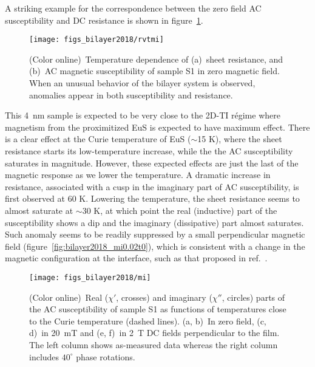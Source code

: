 A striking example for the correspondence between the zero field AC susceptibility and DC resistance is shown in figure~\ref{fig:bilayer2018_mirvt}. %
 \begin{figure}[ht]%
	\centering%
    \subfloat{\label{fig:bilayer2018_s1rvt}}%
    \subfloat{\label{fig:bilayer2018_s1mi}}%
    \texttt{[image: figs\_bilayer2018/rvtmi]}%
    \caption[Coincidental magnetic and resistive anomalies in a (Bi$_{x}$Sb$_{1-x}$)$_2$Te$_3$--EuS bilayer]{\label{fig:bilayer2018_mirvt}(Color online)~Temperature dependence of (a)~sheet resistance, and (b)~AC magnetic susceptibility of sample S1 in zero magnetic field. When an unusual behavior of the bilayer system is observed, anomalies appear in both susceptibility and resistance.}%
\end{figure}%
This 4~nm sample is expected to be very close to the 2D-TI r\'egime where magnetism from the proximitized EuS is expected to have maximum effect. There is a clear effect at the Curie temperature of EuS ($\sim$15 K), where the sheet resistance starts its low-temperature increase, while the the AC susceptibility saturates in magnitude. However, these expected effects are just the last of the magnetic response as we lower the temperature. A dramatic increase in resistance, associated with a cusp in the imaginary part of AC susceptibility, is first observed at 60 K. Lowering the temperature, the sheet resistance seems to almost saturate at $\sim$30 K, at which point the real (inductive) part of the susceptibility shows a dip and the imaginary (dissipative) part almost saturates. Such anomaly seems to be readily suppressed by a small perpendicular magnetic field (figure~\ref{fig:bilayer2018_mi0.02t0}), which is consistent with a change in the magnetic configuration at the interface, such as that proposed in ref.~\cite{Moodera2016}. %
\begin{figure}[ht]%
    \centering%
    \subfloat{\label{fig:bilayer2018_mi0t0}}%
    \subfloat{\label{fig:bilayer2018_mi0t40}}%
    \subfloat{\label{fig:bilayer2018_mi0.02t0}}%
    \subfloat{\label{fig:bilayer2018_mi0.02t40}}%
    \subfloat{\label{fig:bilayer2018_mi2t0}}%
    \subfloat{\label{fig:bilayer2018_mi2t40}}%
    \texttt{[image: figs\_bilayer2018/mi]}%
    \caption[AC magnetic susceptibility of a (Bi$_{x}$Sb$_{1-x}$)$_2$Te$_3$--EuS bilayer in external DC fields.]{\label{fig:bilayer2018_mi}(Color online)~Real ($\chi'$, crosses) and imaginary ($\chi''$, circles) parts of the AC susceptibility of sample S1 as functions of temperatures close to the Curie temperature (dashed lines). (a, b)~In zero field, (c, d)~in 20~mT and (e, f)~in 2~T DC fields perpendicular to the film. The left column shows as-measured data whereas the right column includes $40^{\circ}$ phase rotations.}%
\end{figure}%
